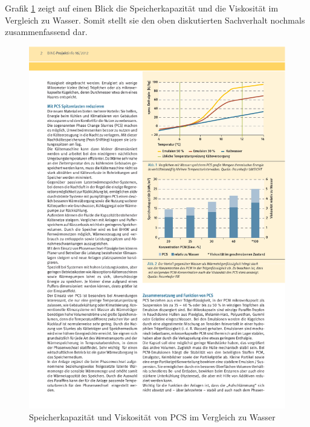 \documentclass[11pt,a4paper]{scrartcl}
\begin{document}
Grafik \ref{fig:BINEVisko} zeigt auf einen Blick die Speicherkapazität und die
Viskosität im Vergleich zu Wasser. Somit stellt sie den oben diskutierten
Sachverhalt nochmals zusammenfassend dar.
\begin{figure}[h!]
\begin{center}
\includegraphics[scale=0.8]{images/BineVisko.pdf}
\caption{Speicherkapazität und Viskosität von PCS im Vergleich zu Wasser
\cite{BINE3}}
\label{fig:BINEVisko}
\end{center}
\end{figure}
\end{document}
